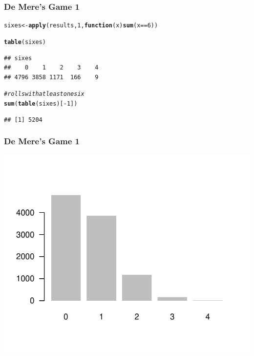 \documentclass[12pt]{beamer}\usepackage[]{graphicx}\usepackage[]{color}
\makeatletter
\newcommand{\hlnum}[1]{\textcolor[rgb]{0.686,0.059,0.569}{#1}}%
\newcommand{\hlcom}[1]{\textcolor[rgb]{0.678,0.584,0.686}{\textit{#1}}}%
\newcommand{\hlopt}[1]{\textcolor[rgb]{0,0,0}{#1}}%
\newcommand{\hlstd}[1]{\textcolor[rgb]{0.345,0.345,0.345}{#1}}%
\newcommand{\hlkwa}[1]{\textcolor[rgb]{0.161,0.373,0.58}{\textbf{#1}}}%
\newcommand{\hlkwb}[1]{\textcolor[rgb]{0.69,0.353,0.396}{#1}}%
\newcommand{\hlkwc}[1]{\textcolor[rgb]{0.333,0.667,0.333}{#1}}%
\newcommand{\hlkwd}[1]{\textcolor[rgb]{0.737,0.353,0.396}{\textbf{#1}}}%
\newenvironment{kframe}{%
 \def\at@end@of@kframe{}%
 \ifinner\ifhmode%
  \def\at@end@of@kframe{\end{minipage}}%
  \begin{minipage}{\columnwidth}%
 \fi\fi%
 \def\FrameCommand##1{\hskip\@totalleftmargin \hskip-\fboxsep
 \colorbox{shadecolor}{##1}\hskip-\fboxsep
     \hskip-\linewidth \hskip-\@totalleftmargin \hskip\columnwidth}%
 \MakeFramed {\advance\hsize-\width
   \@totalleftmargin\z@ \linewidth\hsize
   \@setminipage}}%
 {\par\unskip\endMakeFramed%
 \at@end@of@kframe}
\newenvironment{knitrout}{}{} %
\makeatother
\begin{document}
\begin{frame}[fragile]
\frametitle{De Mere's Game 1}

\begin{knitrout}\footnotesize
{}\color{fgcolor}\begin{kframe}
\begin{alltt}
\hlstd{sixes} \hlkwb{<-} \hlkwd{apply}\hlstd{(results,} \hlnum{1}\hlstd{,} \hlkwa{function}\hlstd{(}\hlkwc{x}\hlstd{)} \hlkwd{sum}\hlstd{(x} \hlopt{==} \hlnum{6}\hlstd{))}

\hlkwd{table}\hlstd{(sixes)}
\end{alltt}
\begin{verbatim}
## sixes
##    0    1    2    3    4 
## 4796 3858 1171  166    9
\end{verbatim}
\end{kframe}
\end{knitrout}

\pause
\begin{knitrout}\footnotesize
{}\color{fgcolor}\begin{kframe}
\begin{alltt}
\hlcom{# rolls with at least one six}
\hlkwd{sum}\hlstd{(}\hlkwd{table}\hlstd{(sixes)[}\hlopt{-}\hlnum{1}\hlstd{])}
\end{alltt}
\begin{verbatim}
## [1] 5204
\end{verbatim}
\end{kframe}
\end{knitrout}

\end{frame}


\begin{frame}[fragile]
\frametitle{De Mere's Game 1}

\begin{knitrout}\footnotesize
{}\color{fgcolor}

{\centering \includegraphics[width=.7\linewidth,height=.6\linewidth]{figure/unnamed-chunk-43-1} 

}



\end{knitrout}

\end{frame}
\end{document}
